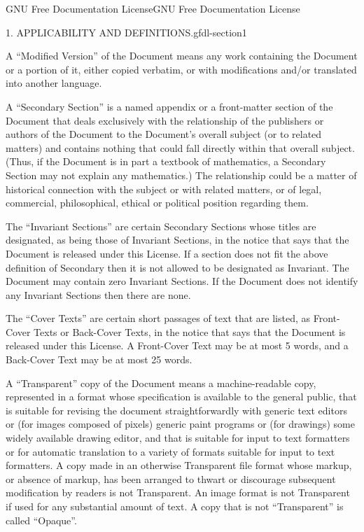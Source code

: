 \documentclass[10pt,]{book}
\numberwithin{equation}{section}
\begin{document}
\begin{appendixptx}{GNU Free Documentation License}{}{GNU Free Documentation License}{}{}
\begin{paragraphs}{1. APPLICABILITY AND DEFINITIONS.}{gfdl-section1}
\par
\hypertarget{p-525}{}%
A ``Modified Version'' of the Document means any work containing the Document or a portion of it, either copied verbatim, or with modifications and/or translated into another language.%
\par
\hypertarget{p-526}{}%
A ``Secondary Section'' is a named appendix or a front-matter section of the Document that deals exclusively with the relationship of the publishers or authors of the Document to the Document's overall subject (or to related matters) and contains nothing that could fall directly within that overall subject. (Thus, if the Document is in part a textbook of mathematics, a Secondary Section may not explain any mathematics.) The relationship could be a matter of historical connection with the subject or with related matters, or of legal, commercial, philosophical, ethical or political position regarding them.%
\par
\hypertarget{p-527}{}%
The ``Invariant Sections'' are certain Secondary Sections whose titles are designated, as being those of Invariant Sections, in the notice that says that the Document is released under this License. If a section does not fit the above definition of Secondary then it is not allowed to be designated as Invariant. The Document may contain zero Invariant Sections. If the Document does not identify any Invariant Sections then there are none.%
\par
\hypertarget{p-528}{}%
The ``Cover Texts'' are certain short passages of text that are listed, as Front-Cover Texts or Back-Cover Texts, in the notice that says that the Document is released under this License. A Front-Cover Text may be at most 5 words, and a Back-Cover Text may be at most 25 words.%
\par
\hypertarget{p-529}{}%
A ``Transparent'' copy of the Document means a machine-readable copy, represented in a format whose specification is available to the general public, that is suitable for revising the document straightforwardly with generic text editors or (for images composed of pixels) generic paint programs or (for drawings) some widely available drawing editor, and that is suitable for input to text formatters or for automatic translation to a variety of formats suitable for input to text formatters. A copy made in an otherwise Transparent file format whose markup, or absence of markup, has been arranged to thwart or discourage subsequent modification by readers is not Transparent. An image format is not Transparent if used for any substantial amount of text. A copy that is not ``Transparent'' is called ``Opaque''.%

\end{paragraphs}
\end{appendixptx}
\end{document}

